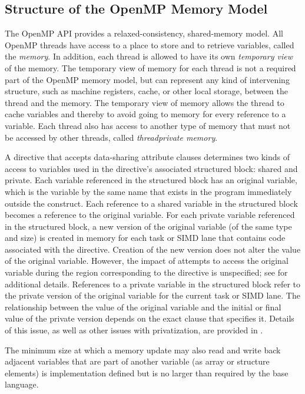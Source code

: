 \subsection{Structure of the OpenMP Memory Model}
\label{subsec:Structure of the OpenMP Memory Model}
The OpenMP API provides a relaxed-consistency, shared-memory model. All OpenMP
threads have access to a place to store and to retrieve variables,
called the \emph{memory}. In addition, each thread is allowed to have 
its own \emph{temporary view} of the memory. The temporary view of memory 
for each thread is not a required part of the OpenMP memory model, but 
can represent any kind of intervening structure, such as machine
registers, cache, or other local storage, between the thread and 
the memory. The temporary view of memory allows the thread to cache 
variables and thereby to avoid going to memory for every reference 
to a variable. Each thread also has access to another type of memory 
that must not be accessed by other threads, called \emph{threadprivate memory}.

A directive that accepts data-sharing attribute clauses determines 
two kinds of access to variables used in the directive's associated 
structured block: shared and private. Each variable referenced in 
the structured block has an original variable, which is the variable
by the same name that exists in the program immediately outside the 
construct. Each reference to a shared variable in the structured block 
becomes a reference to the original variable. For each private variable 
referenced in the structured block, a new version of the original 
variable (of the same type and size) is created in memory for each task or
SIMD lane that contains code associated with the directive. Creation of 
the new version does not alter the value of the original variable. 
However, the impact of attempts to access the original variable during 
the region corresponding to the directive is unspecified; see 
 for additional details. References to a
private variable in the structured block refer to the private version 
of the original variable for the current task or SIMD lane. The 
relationship between the value of the original variable and the 
initial or final value of the private version depends on the exact
clause that specifies it. Details of this issue, as well as other 
issues with privatization, are provided in .

The minimum size at which a memory update may also read and write back adjacent
variables that are part of another variable (as array or structure elements) is
implementation defined but is no larger than required by the base language.

